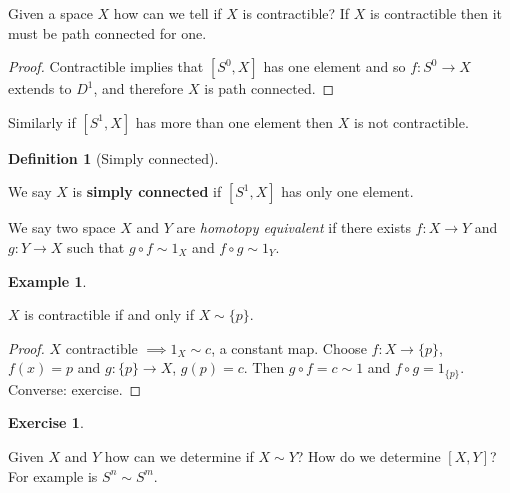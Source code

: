 \documentclass[10pt,]{book}
\newcommand{\terminology}[1]{\textbf{#1}}
\theoremstyle{plain}
\theoremstyle{definition}
\newtheorem{definition}[theorem]{Definition}
\newtheorem{example}[theorem]{Example}
\newtheorem{exercise}[theorem]{Exercise}
\numberwithin{equation}{section}
\begin{document}
            Given a space \(X\) how can we tell if \(X\) is contractible? If \(X\) is
            contractible then it must be path connected for one.

            \begin{proof}

              Contractible implies that \([S^0, X]\) has one element and so \(f \colon
              S^0 \to X\) extends to \(D^1\), and therefore \(X\) is path connected. \end{proof}


            Similarly if \([S^1, X]\) has more than one element then \(X\) is not
            contractible.
\begin{definition}[Simply connected]\label{definition-3}

              We say \(X\) is \terminology{simply connected} if \([S^1, X]\) has only one
              element.

              We say two space \(X\) and \(Y\) are \emph{homotopy equivalent} if there
              exists \(f\colon X \to Y\) and \(g\colon Y \to X\) such that \(g\circ f
              \sim 1_X\) and \(f\circ g \sim 1_Y\).
            \end{definition}
\begin{example}\label{example-2}

              \(X\) is contractible if and only if \(X \sim \{p\}\).
\begin{proof}
\(X\) contractible \(\implies 1_X \sim c\), a constant map.
              Choose \(f\colon X \to \{p\}\), \(f(x) = p\) and \(g\colon\{p\} \to X\),
              \(g(p) = c\). Then \(g\circ f = c \sim 1\) and \(f\circ g = 1_{\{p\}}\).
              Converse: exercise.
            \end{proof}
\end{example}
\begin{exercise}\label{exercise-1}
\end{exercise}
\par

            Given \(X\) and \(Y\) how can we determine if \(X\sim Y\)?
            How do we determine \([X,Y]\)?
            For example is \(S^n \sim S^m\).
\typeout{************************************************}
\typeout{************************************************}
\end{document}
